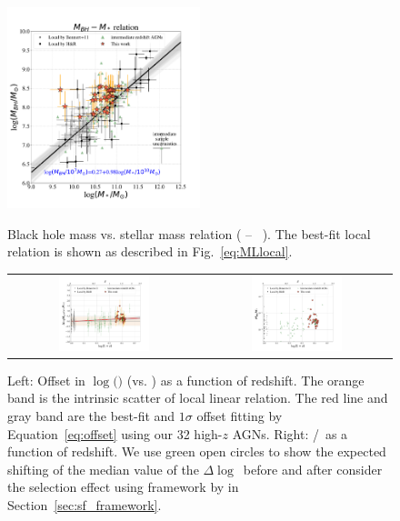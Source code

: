 \documentclass[apj]{emulateapj}
\begin{document}
\begin{figure}
\centering
{
\includegraphics[width=0.5\textwidth]{fig/MBH-Mstar.pdf}
}
\caption{\label{fig:MM} 
Black hole mass vs. stellar mass relation ( \mbh -- \smass\ ). The best-fit local relation is shown as described in Fig.~\ref{eq:MLlocal}.
}
\end{figure} 

\begin{figure}
\centering
\begin{tabular}{c c}
{\includegraphics[width=0.5\textwidth]{fig/MBH-Mstar-vz_style1.pdf}}&
{\includegraphics[width=0.5\textwidth]{fig/MBH-Mstar-vz_style0.pdf}}\\
\end{tabular}
\caption{\label{fig:MM-vz} 
Left: Offset in  $\log($\mbh$)$ (vs. \smass) as a function of redshift. The orange band is the intrinsic scatter of local linear relation. The red line and gray band are the best-fit and $1\sigma$ offset fitting by Equation~\ref{eq:offset} using our 32 high-$z$ AGNs.
Right: \mbh/\smass\ as a function of redshift. 
We use green open circles to show the expected shifting of the median value of the $\Delta \log$\mbh\ before and after consider the selection effect using framework by \citet{Schulze2011} in Section~\ref{sec:sf_framework}.}
\end{figure} 
\end{document}
